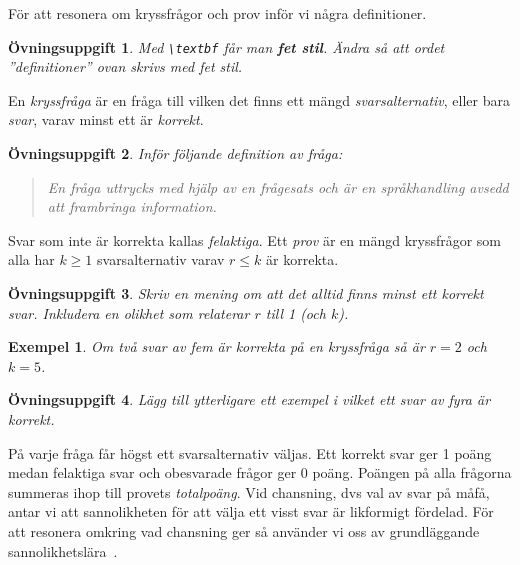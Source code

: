 \documentclass[12pt,a4wide]{article}
\newtheorem{exempel}{Exempel} %
\theoremstyle{uppgiftsstil}
\newcommand{\ovningstext}{Övningsuppgift}
\newtheorem{ovning}{\ovningstext}
\newenvironment{uppgift}{\begin{framed}\begin{ovning}}%
                        {\end{ovning}\end{framed}}
\theoremstyle{avklaradstil}
\begin{document}
För att resonera om kryssfrågor och prov inför vi några definitioner. 
%
\begin{uppgift}
  Med \verb|\textbf| får man \textbf{fet stil}. Ändra så att ordet
  ''definitioner'' ovan skrivs med fet stil. 
\end{uppgift}
%
En \emph{kryssfråga}         %
är en fråga till vilken det finns ett mängd \emph{svarsalternativ},
eller bara \emph{svar}, varav minst ett är \emph{korrekt}. 
%
\begin{uppgift}
  Inför följande definition av \emph{fråga}:
%
  \begin{quote}
    En fråga uttrycks med hjälp av en frågesats och är en
    språkhandling avsedd att frambringa information. 
  \end{quote}
%
\end{uppgift}
%
Svar som inte är korrekta kallas \emph{felaktiga}. Ett \emph{prov} är
en mängd kryssfrågor som alla har 
$k \geq 1$        %
svarsalternativ varav 
$r \leq k$        %
är korrekta.
%
\begin{uppgift}
  Skriv en mening om att det alltid finns minst ett korrekt
  svar. Inkludera en olikhet som relaterar $r$ till 1 (och $k$). 
\end{uppgift}
%
%
%
%
%
\begin{exempel}    %
  Om två svar av fem är korrekta på en kryssfråga så är $r = 2$ och
  $k = 5$.
\end{exempel}       %
%
\begin{uppgift}
  \label{exuppgift}
  Lägg till ytterligare ett exempel i vilket ett svar av fyra är
  korrekt. 
\end{uppgift}
%
%
%
%
På varje fråga får högst ett svarsalternativ väljas. Ett korrekt svar
ger 1 poäng medan felaktiga svar och obesvarade frågor ger 0
poäng. Poängen på alla frågorna summeras ihop till provets
\emph{totalpoäng}. Vid chansning, dvs val av svar på måfå, antar vi
att sannolikheten för att välja ett visst svar är likformigt
fördelad. För att resonera omkring vad chansning ger så använder vi
oss av grundläggande sannolikhetslära~\cite{grimaldi}.  
\end{document}
